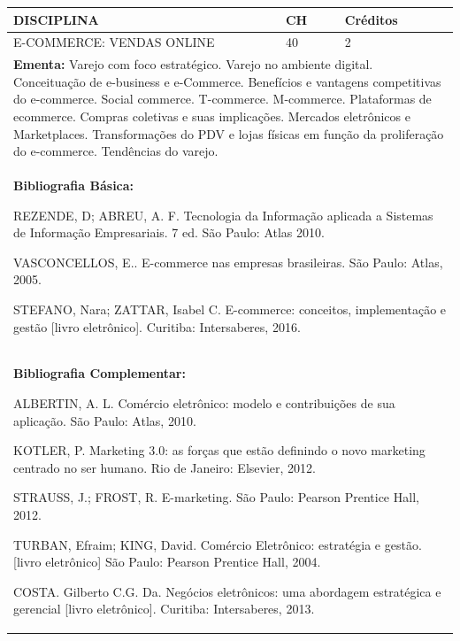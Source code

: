 \documentclass[a4paper, 12pt, openright, oneside, german, french, english, brazil]{abntex2}
\begin{document}
\begin{table}[!h]
  \footnotesize
  \centering
  \begin{tabular}{|p{100mm}|p{10mm}|p{20mm}|}
    \hline
    \textbf{DISCIPLINA} & \textbf{CH} & \textbf{Créditos} \\
    \hline
    E-COMMERCE: VENDAS ONLINE & 40 & 2 \\
    \hline
    \multicolumn{3}{|p{130mm}|}{\textbf{Ementa:}  Varejo com foco estratégico. Varejo no ambiente digital. Conceituação de e-business e e-Commerce. Benefícios e vantagens competitivas do e-commerce. Social commerce. T-commerce. M-commerce. Plataformas de ecommerce. Compras coletivas e suas implicações. Mercados eletrônicos e Marketplaces. Transformações do PDV e lojas físicas em função da proliferação do e-commerce. Tendências do varejo.} \\
    \hline
    \multicolumn{3}{|p{130mm}|}{\textbf{Bibliografia Básica:}

    REZENDE, D; ABREU, A. F. Tecnologia da Informação aplicada a Sistemas de Informação Empresariais. 7 ed. São Paulo: Atlas 2010. 

VASCONCELLOS, E.. E-commerce nas empresas brasileiras. São Paulo: Atlas, 2005.

STEFANO, Nara; ZATTAR, Isabel C. E-commerce: conceitos, implementação e gestão [livro eletrônico]. Curitiba: Intersaberes, 2016.
} \\
    \hline
    \multicolumn{3}{|p{130mm}|}{\textbf{Bibliografia Complementar:}

    ALBERTIN, A. L. Comércio eletrônico: modelo e contribuições de sua aplicação. São Paulo: Atlas, 2010. 

KOTLER, P. Marketing 3.0: as forças que estão definindo o novo marketing centrado no ser humano. Rio de Janeiro: Elsevier, 2012.

STRAUSS, J.; FROST, R. E-marketing. São Paulo: Pearson Prentice Hall, 2012. 

TURBAN, Efraim; KING, David. Comércio Eletrônico: estratégia e gestão. [livro eletrônico] São Paulo: Pearson Prentice Hall, 2004. 

COSTA. Gilberto C.G. Da. Negócios eletrônicos: uma abordagem estratégica e gerencial [livro eletrônico]. Curitiba: Intersaberes, 2013.
} \\
    \hline
  \end{tabular}
\end{table}
\end{document}
